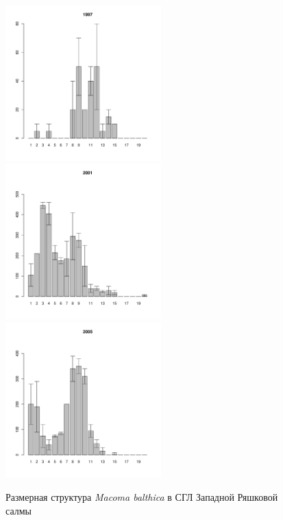 \documentclass[12pt, a4paper]{article}
\begin{document}
\begin{figure}[h]
\begin{multicols}{3}
\hfill
\includegraphics[width=60mm]{../White_Sea/Ryashkov_ZRS/zrs_1997_.pdf}
\hfill
\includegraphics[width=60mm]{../White_Sea/Ryashkov_ZRS/zrs_2001_.pdf}
\hfill
\includegraphics[width=60mm]{../White_Sea/Ryashkov_ZRS/zrs_2005_.pdf}
\end{multicols}


\caption{Размерная структура {\it Macoma balthica} в СГЛ Западной Ряшковой салмы}
\label{ris:size_str_ZRS}
\end{figure}
\end{document}
